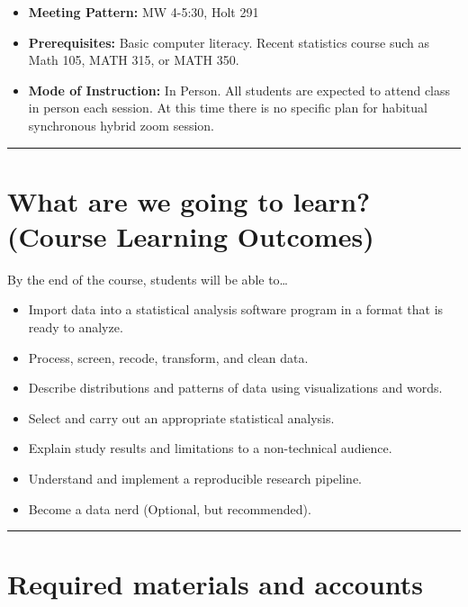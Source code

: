 \documentclass[
  letterpaper,
  DIV=11,
  numbers=noendperiod]{scrartcl}
\providecommand{\tightlist}{%
  \setlength{\itemsep}{0pt}\setlength{\parskip}{0pt}}\usepackage{longtable,booktabs,array}
\begin{document}
\begin{itemize}
\tightlist
\item
  \textbf{Meeting Pattern:} MW 4-5:30, Holt 291
\item
  \textbf{Prerequisites:} Basic computer literacy. Recent statistics
  course such as Math 105, MATH 315, or MATH 350.\\
\item
  \textbf{Mode of Instruction:} In Person. All students are expected to
  attend class in person each session. At this time there is no specific
  plan for habitual synchronous hybrid zoom session.
\end{itemize}

\begin{center}\rule{0.5\linewidth}{0.5pt}\end{center}

\hypertarget{what-are-we-going-to-learn-course-learning-outcomes}{%
\section{What are we going to learn? (Course Learning
Outcomes)}\label{what-are-we-going-to-learn-course-learning-outcomes}}

By the end of the course, students will be able to\ldots{}

\begin{itemize}
\tightlist
\item
  Import data into a statistical analysis software program in a format
  that is ready to analyze.
\item
  Process, screen, recode, transform, and clean data.
\item
  Describe distributions and patterns of data using visualizations and
  words.
\item
  Select and carry out an appropriate statistical analysis.
\item
  Explain study results and limitations to a non-technical audience.
\item
  Understand and implement a reproducible research pipeline.
\item
  Become a data nerd (Optional, but recommended).
\end{itemize}

\begin{center}\rule{0.5\linewidth}{0.5pt}\end{center}

\hypertarget{required-materials-and-accounts}{%
\section{Required materials and
accounts}\label{required-materials-and-accounts}}
\end{document}
